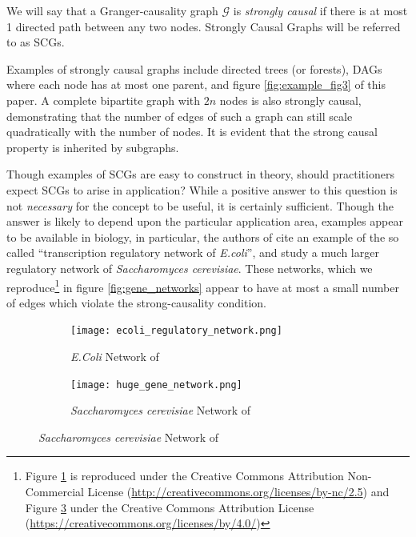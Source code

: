 \documentclass[12pt]{article}
\def\gcg{\mathcal{G}}  %
\begin{document}
\begin{definition}
  \label{def:strongly_causal}
  We will say that a Granger-causality graph $\gcg$ is
  \textit{strongly causal} if there is at most 1 directed path between
  any two nodes.  Strongly Causal Graphs will be referred to as SCGs.
\end{definition}

Examples of strongly causal graphs include directed trees (or
forests), DAGs where each node has at most one parent, and figure
\ref{fig:example_fig3} of this paper.  A complete bipartite graph with
$2n$ nodes is also strongly causal, demonstrating that the number of
edges of such a graph can still scale quadratically with the number of
nodes.  It is evident that the strong causal property is inherited by
subgraphs.

\begin{example}
  Though examples of SCGs are easy to construct in theory, should
  practitioners expect SCGs to arise in application?  While a positive
  answer to this question is not \textit{necessary} for the concept to
  be useful, it is certainly sufficient.  Though the answer is likely
  to depend upon the particular application area, examples appear to
  be available in biology, in particular, the authors of
  \cite{discovering_graphical_Granger_causality_using_the_truncating_lasso_penalty}
  cite an example of the so called ``transcription regulatory network
  of \textit{E.coli}'', and
  \cite{learning_genome_scale_regulatory_networks} study a much larger
  regulatory network of \textit{Saccharomyces cerevisiae}.  These
  networks, which we reproduce\footnote{Figure \ref{fig:gene_network1}
    is reproduced under the Creative Commons Attribution
    Non-Commercial License
    (\url{http://creativecommons.org/licenses/by-nc/2.5}) and Figure
    \ref{fig:gene_network2} under the Creative Commons Attribution
    License (\url{https://creativecommons.org/licenses/by/4.0/})} in
  figure \ref{fig:gene_networks} appear to have at most a small number
  of edges which violate the strong-causality condition.

  \begin{figure}[h]
    \centering
    \caption{Transcription Regulatory Networks}
    \label{fig:gene_networks}
    \begin{subfigure}[b]{0.45\textwidth}
      \caption{\textit{E.Coli} Network of
        \cite{discovering_graphical_Granger_causality_using_the_truncating_lasso_penalty}}
      \label{fig:gene_network1}
      \texttt{[image: ecoli\_regulatory\_network.png]}
    \end{subfigure}
    \begin{subfigure}[b]{0.45\textwidth}
      \caption{\textit{Saccharomyces cerevisiae} Network of
        \cite{learning_genome_scale_regulatory_networks}}
      \label{fig:gene_network2}
      \texttt{[image: huge\_gene\_network.png]}
    \end{subfigure}
  \end{figure}
\end{example}
\end{document}
